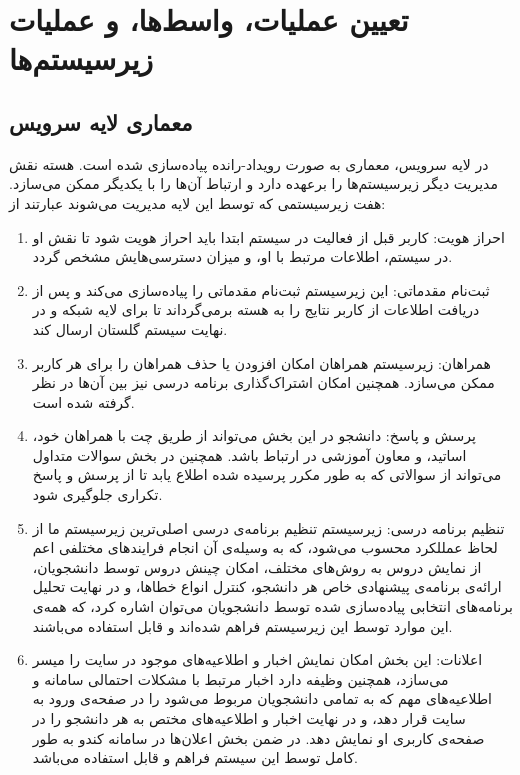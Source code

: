 \documentclass{report}
\begin{document}
\section{تعیین عملیات، واسط‌ها، و عملیات زیرسیستم‌ها}

\subsection{معماری لایه سرویس}
در لایه سرویس، معماری به صورت رویداد-رانده پیاده‌سازی شده است. هسته نقش مدیریت دیگر زیرسیستم‌ها را برعهده دارد و ارتباط آن‌ها را با یکدیگر ممکن می‌سازد. هفت زیرسیستمی که توسط این لایه مدیریت می‌شوند عبارتند از:

\begin{enumerate}
\item
احراز هویت: 
کاربر قبل از فعالیت در سیستم ابتدا باید احراز هویت شود تا نقش او در سیستم، اطلاعات مرتبط با او، و میزان دسترسی‌هایش مشخص گردد.

\item
ثبت‌نام مقدماتی: 
این زیرسیستم ثبت‌نام مقدماتی را پیاده‌سازی می‌کند و پس از دریافت اطلاعات از کاربر نتایج را به هسته برمی‌گرداند تا برای لایه شبکه و در نهایت سیستم گلستان ارسال کند.

\item
همراهان: 
زیرسیستم همراهان امکان افزودن یا حذف همراهان را برای هر کاربر ممکن می‌سازد. همچنین امکان اشتراک‌گذاری برنامه درسی نیز بین آن‌ها در نظر گرفته شده است.

\item
پرسش و پاسخ: 
دانشجو در این بخش می‌تواند از طریق چت با همراهان خود، اساتید، و معاون آموزشی در ارتباط باشد. همچنین در بخش سوالات متداول می‌تواند از سوالاتی که به طور مکرر پرسیده شده اطلاع یابد تا از پرسش و پاسخ تکراری جلوگیری شود.

\item
تنظیم برنامه درسی: 
زیرسیستم تنظیم برنامه‌ی درسی اصلی‌ترین زیرسیستم ما از لحاظ عمللکرد محسوب می‌شود، که به وسیله‌ی آن انجام فرایندهای مختلفی اعم از نمایش دروس به روش‌های مختلف، امکان چینش دروس توسط دانشجویان، ارائه‌ی برنامه‌ی پیشنهادی خاص هر دانشجو، کنترل انواع خطاها، و در نهایت تحلیل برنامه‌های انتخابی پیاده‌سازی شده توسط دانشجویان می‌توان اشاره کرد، که همه‌ی این موارد توسط این زیرسیستم فراهم شده‌اند و قابل استفاده می‌باشند.

\item
اعلانات: 
این بخش امکان نمایش اخبار و اطلاعیه‌های موجود در سایت را میسر می‌سازد، همچنین وظیفه دارد اخبار مرتبط با مشکلات احتمالی سامانه و اطلاعیه‌‌‌های مهم که به تمامی دانشجویان مربوط می‌شود را در صفحه‌ی ورود به سایت قرار دهد، و در نهایت اخبار و اطلاعیه‌های مختص به هر دانشجو را در صفحه‌ی کاربری او نمایش دهد. در ضمن بخش اعلان‌ها در سامانه کندو به طور کامل توسط این سیستم فراهم و قابل استفاده می‌باشد.


\end{enumerate}
\end{document}
